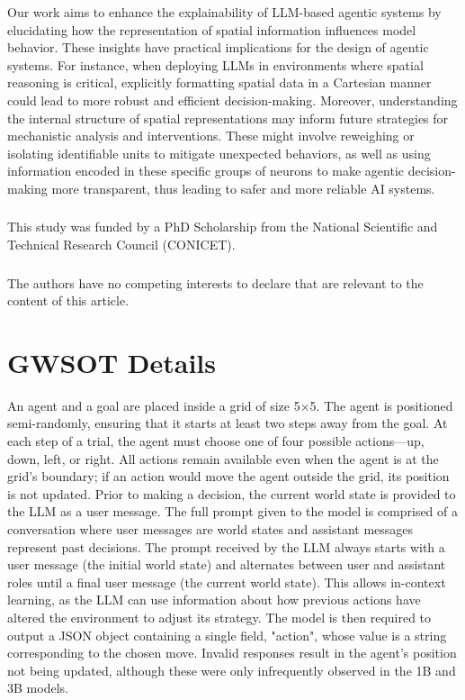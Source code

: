\documentclass[runningheads]{llncs}
\begin{document}
Our work aims to enhance the explainability of LLM-based agentic systems by elucidating how the representation of spatial information influences model behavior. These insights have practical implications for the design of agentic systems. For instance, when deploying LLMs in environments where spatial reasoning is critical, explicitly formatting spatial data in a Cartesian manner could lead to more robust and efficient decision-making. Moreover, understanding the internal structure of spatial representations may inform future strategies for mechanistic analysis and interventions. These might involve reweighing or isolating identifiable units to mitigate unexpected behaviors, as well as using information encoded in these specific groups of neurons to make agentic decision-making more transparent, thus leading to safer and more reliable AI systems.

\begin{credits}
    \subsubsection{\ackname} This study was funded by a PhD Scholarship from the National Scientific and Technical Research Council (CONICET).
    
    \subsubsection{\discintname}
    The authors have no competing interests to declare that are relevant to the content of this article.
    \end{credits}




\appendix
\section{GWSOT Details}

An agent and a goal are placed inside a grid of size 5×5. The agent is positioned semi-randomly, ensuring that it starts at least two steps away from the goal. At each step of a trial, the agent must choose one of four possible actions—up, down, left, or right. All actions remain available even when the agent is at the grid’s boundary; if an action would move the agent outside the grid, its position is not updated. Prior to making a decision, the current world state is provided to the LLM as a user message. The full prompt given to the model is comprised of a conversation where user messages are world states and assistant messages represent past decisions. The prompt received by the LLM always starts with a user message (the initial world state) and alternates between user and assistant roles until a final user message (the current world state). This allows in-context learning, as the LLM can use information about how previous actions have altered the environment to adjust its strategy. The model is then required to output a JSON object containing a single field, "action", whose value is a string corresponding to the chosen move. Invalid responses result in the agent’s position not being updated, although these were only infrequently observed in the 1B and 3B models.
\end{document}
